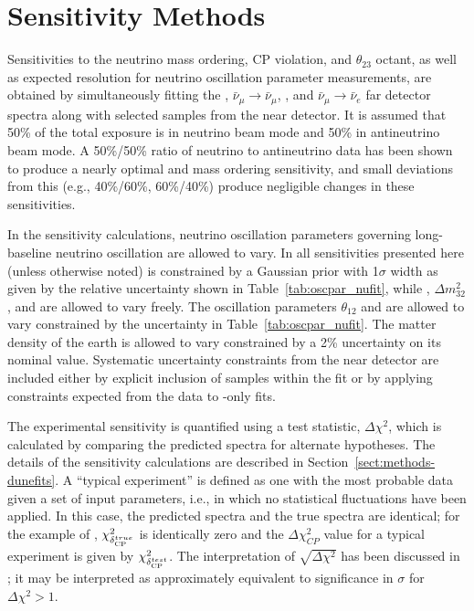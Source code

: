 \section{Sensitivity Methods}
\label{sec:physics-lbnosc-sens}



Sensitivities to the neutrino mass ordering, CP violation, and $\theta_{23}$ octant, as well as expected resolution for neutrino oscillation parameter measurements, are obtained by simultaneously fitting the \numutonumu, $\bar{\nu}_\mu \rightarrow \bar{\nu}_\mu$, \numutonue, and $\bar{\nu}_\mu \rightarrow \bar{\nu}_e$ far detector spectra along with selected samples from the near detector.  It is assumed that 50\% of the total exposure is in neutrino beam mode and 50\% in antineutrino beam mode.  A 50\%/50\% ratio of neutrino to antineutrino data has been shown to produce a nearly optimal \deltacp and mass ordering sensitivity, and small deviations from this (e.g., 40\%/60\%, 60\%/40\%) produce negligible changes in these sensitivities. %

In the sensitivity calculations, neutrino oscillation parameters governing long-baseline neutrino oscillation are allowed to vary. In all sensitivities presented here (unless otherwise noted)  is constrained by a Gaussian prior with 1$\sigma$ width as given by the relative uncertainty shown in Table~\ref{tab:oscpar_nufit}, while , $\Delta m^{2}_{32}$, and \deltacp are allowed to vary freely. The oscillation parameters $\theta_{12}$ and  are allowed to vary constrained by the uncertainty in Table~\ref{tab:oscpar_nufit}. The matter density of the earth is allowed to vary constrained by a 2\% uncertainty on its nominal value. Systematic uncertainty constraints from the near detector are included either by explicit inclusion of  samples within the fit or by applying constraints expected from the  data to -only fits.

The experimental sensitivity is quantified using a test statistic, $\Delta\chi^2$, which is calculated by comparing the predicted spectra for alternate hypotheses.  The details of the sensitivity calculations are described in Section~\ref{sect:methods-dunefits}. 
A ``typical experiment'' is defined as one with the most probable data given a set of input parameters, i.e., in which no statistical fluctuations have been applied. In this case, the predicted spectra and the true spectra are identical; for the example of , $\chi^2_{\delta_{\rm CP}^{true}}$ is identically zero and the $\Delta\chi^2_{CP}$ value for a typical experiment is given by $\chi^2_{\delta_{\rm CP}^{test}}$. The interpretation of $\sqrt{\Delta\chi^2}$ has been discussed in \cite{Qian:2012zn,Blennow:2013oma}; it may be interpreted as approximately equivalent to significance in $\sigma$ for $\Delta\chi^2>1$. 




